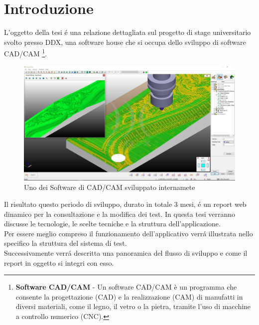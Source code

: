 \chapter{Introduzione}
    L'oggetto della tesi \'e una relazione dettagliata sul progetto di stage universitario svolto presso DDX,
    una software house che si occupa dello sviluppo di software CAD/CAM
    \footnote{\textbf{Software CAD/CAM} - Un software CAD/CAM è un programma che consente la progettazione (CAD)
    e la realizzazione (CAM) di manufatti in diversi materiali, come il legno, il vetro o la pietra, tramite 
    l'uso di macchine a controllo numerico (CNC).}.\\

    \begin{figure}[h]
        \includegraphics[width=\textwidth]{images/easywood.jpg}
        \caption{Uno dei Software di CAD/CAM sviluppato internamete}
    \end{figure}

    Il risultato questo periodo di sviluppo, durato in totale 3 mesi, \'e un report web dinamico per la consultazione e la modifica dei test. 
    In questa tesi verranno discusse le tecnologie, le scelte tecniche e la struttura dell'applicazione.\\

    Per essere meglio compreso il funzionamento dell'applicativo verr\'a illustrata nello specifico la struttura del sistema di test.\\
    Successivamente verr\'a descritta una panoramica del flusso di sviluppo e come il report in oggetto si integri con esso. \\
